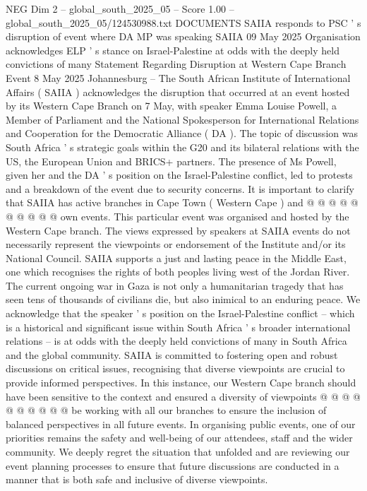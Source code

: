 \begin{textsample}{NEG Dim 2 – global\_south\_2025\_05 – Score 1.00 – global\_south\_2025\_05/124530988.txt}  \label{ex:f2_neg_153}
DOCUMENTS SAIIA responds to PSC ' s disruption of event where DA MP was speaking SAIIA 09 May 2025 Organisation acknowledges ELP ' s stance on Israel-Palestine at odds with the deeply held convictions of many Statement Regarding Disruption at Western Cape Branch Event 8 May 2025 Johannesburg -- The South African Institute of International Affairs ( SAIIA ) acknowledges the disruption that occurred at an event hosted by its Western Cape Branch on 7 May, with speaker Emma Louise Powell, a Member of Parliament and the National Spokesperson for International Relations and Cooperation for the Democratic Alliance ( DA ).
The topic of discussion was South Africa ' s strategic goals within the G20 and its bilateral relations with the US, the European Union and BRICS+ partners.
The presence of Ms Powell, given her and the DA ' s position on the Israel-Palestine conflict, led to protests and a breakdown of the event due to security concerns.
It is important to clarify that SAIIA has active branches in Cape Town ( Western Cape ) and @ @ @ @ @ @ @ @ @ @ own events.
This particular event was organised and hosted by the Western Cape branch.
The views expressed by speakers at SAIIA events do not necessarily represent the viewpoints or endorsement of the Institute and/or its National Council.
SAIIA supports a just and lasting peace in the Middle East, one which recognises the rights of both peoples living west of the Jordan River.
The current ongoing war in Gaza is not only a humanitarian tragedy that has seen tens of thousands of civilians die, but also inimical to an enduring peace.
We acknowledge that the speaker ' s position on the Israel-Palestine conflict -- which is a historical and significant issue within South Africa ' s broader international relations -- is at odds with the deeply held convictions of many in South Africa and the global community.
SAIIA is committed to fostering open and robust discussions on critical issues, recognising that diverse viewpoints are crucial to provide informed perspectives.
In this instance, our Western Cape branch should have been sensitive to the context and ensured a diversity of viewpoints @ @ @ @ @ @ @ @ @ @ be working with all our branches to ensure the inclusion of balanced perspectives in all future events.
In organising public events, one of our priorities remains the safety and well-being of our attendees, staff and the wider community.
We deeply regret the situation that unfolded and are reviewing our event planning processes to ensure that future discussions are conducted in a manner that is both safe and inclusive of diverse viewpoints.

\end{textsample}
